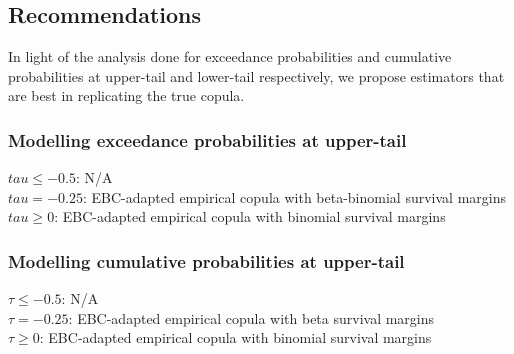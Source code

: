 \documentclass[12pt]{report}
\newcommand{\1}{\mathbf{1}}
\begin{document}
\begin{flushleft}
\newpage
\subsection{Recommendations}

In light of the analysis done for exceedance probabilities and cumulative probabilities at upper-tail and lower-tail respectively, we propose estimators that are best in replicating the true copula.

\subsubsection{Modelling exceedance probabilities at upper-tail}
$tau \le -0.5$: N/A\\
$tau = -0.25$: EBC-adapted empirical copula with beta-binomial survival margins \\
$tau \ge 0$: EBC-adapted empirical copula with binomial survival margins

\subsubsection{Modelling cumulative probabilities at upper-tail}
$\tau \le -0.5$: N/A\\
$\tau = -0.25$: EBC-adapted empirical copula with beta survival margins \\
$\tau \ge 0$: EBC-adapted empirical copula with binomial survival margins

\newpage

\end{flushleft}
\end{document}
